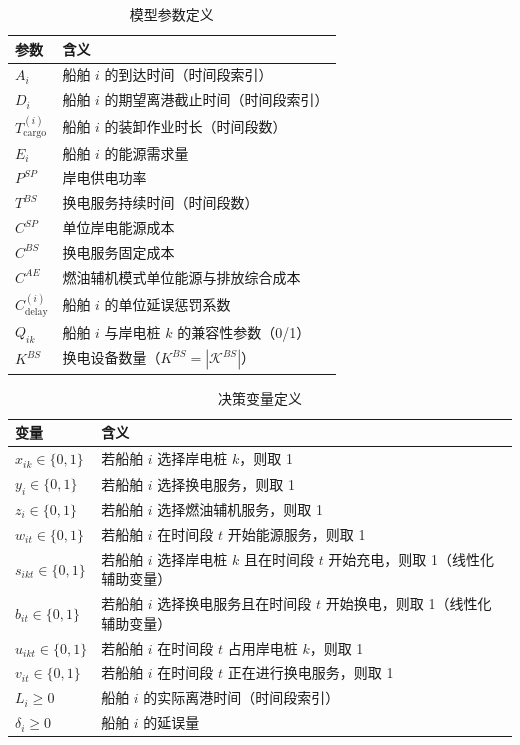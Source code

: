 \documentclass[UTF8, a4paper, 12pt]{ctexart}
\theoremstyle{plain}
\theoremstyle{definition}
\theoremstyle{remark}
\begin{document}
\begin{table}[!htbp]
\centering
\caption{模型参数定义}
\begin{tabular}{ll}
\toprule
参数 & 含义 \\
\midrule
$A_i$ & 船舶 $i$ 的到达时间（时间段索引） \\
$D_i$ & 船舶 $i$ 的期望离港截止时间（时间段索引） \\
$T^{(i)}_{\text{cargo}}$ & 船舶 $i$ 的装卸作业时长（时间段数） \\
$E_i$ & 船舶 $i$ 的能源需求量 \\
$P^{SP}$ & 岸电供电功率 \\
$T^{BS}$ & 换电服务持续时间（时间段数） \\
$C^{SP}$ & 单位岸电能源成本 \\
$C^{BS}$ & 换电服务固定成本 \\
$C^{AE}$ & 燃油辅机模式单位能源与排放综合成本 \\
$C^{(i)}_{\text{delay}}$ & 船舶 $i$ 的单位延误惩罚系数 \\
$Q_{ik}$ & 船舶 $i$ 与岸电桩 $k$ 的兼容性参数（0/1） \\
$K^{BS}$ & 换电设备数量（$K^{BS}=|\mathcal{K}^{BS}|$） \\
\bottomrule
\end{tabular}
\end{table}


\begin{table}[!htbp]
\centering
\caption{决策变量定义}
\begin{tabularx}{\textwidth}{>{\raggedright\arraybackslash}p{} X}
\toprule
变量 & 含义 \\
\midrule
$x_{ik} \in \{0,1\}$ & 若船舶 $i$ 选择岸电桩 $k$，则取 1 \\
$y_i \in \{0,1\}$ & 若船舶 $i$ 选择换电服务，则取 1 \\
$z_i \in \{0,1\}$ & 若船舶 $i$ 选择燃油辅机服务，则取 1 \\
$w_{it} \in \{0,1\}$ & 若船舶 $i$ 在时间段 $t$ 开始能源服务，则取 1 \\
$s_{ikt} \in \{0,1\}$ & 若船舶 $i$ 选择岸电桩 $k$ 且在时间段 $t$ 开始充电，则取 1（线性化辅助变量） \\
$b_{it} \in \{0,1\}$ & 若船舶 $i$ 选择换电服务且在时间段 $t$ 开始换电，则取 1（线性化辅助变量） \\
$u_{ikt} \in \{0,1\}$ & 若船舶 $i$ 在时间段 $t$ 占用岸电桩 $k$，则取 1 \\
$v_{it} \in \{0,1\}$ & 若船舶 $i$ 在时间段 $t$ 正在进行换电服务，则取 1 \\
$L_i \ge 0$ & 船舶 $i$ 的实际离港时间（时间段索引） \\
$\delta_i \ge 0$ & 船舶 $i$ 的延误量 \\
\bottomrule
\end{tabularx}
\end{table}
\end{document}
